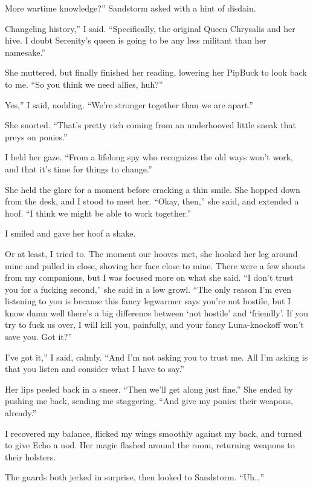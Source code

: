 \leavevmode{}More wartime knowledge?” Sandstorm asked with a hint of disdain.

\leavevmode{}Changeling history,” I said. “Specifically, the original Queen Chrysalis and her hive. I doubt Serenity’s queen is going to be any less militant than her namesake.”

She muttered, but finally finished her reading, lowering her PipBuck to look back to me. “So you think we need allies, huh?”

\leavevmode{}Yes,” I said, nodding. “We’re stronger together than we are apart.”

She snorted. “That’s pretty rich coming from an underhooved little sneak that preys on ponies.”

I held her gaze. “From a lifelong spy who recognizes the old ways won’t work, and that it’s time for things to change.”

She held the glare for a moment before cracking a thin smile. She hopped down from the desk, and I stood to meet her. “Okay, then,” she said, and extended a hoof. “I think we might be able to work together.”

I smiled and gave her hoof a shake.

Or at least, I tried to. The moment our hooves met, she hooked her leg around mine and pulled in close, shoving her face close to mine. There were a few shouts from my companions, but I was focused more on what she said. “I don’t trust you for a fucking second,” she said in a low growl. “The only reason I’m even listening to you is because this fancy legwarmer says you’re not hostile, but I know damn well there’s a big difference between ‘not hostile’ and ‘friendly’. If you try to fuck us over, I will kill you, painfully, and your fancy Luna-knockoff won’t save you. Got it?”

\leavevmode{}I’ve got it,” I said, calmly. “And I’m not asking you to trust me. All I’m asking is that you listen and consider what I have to say.”

Her lips peeled back in a sneer. “Then we’ll get along just fine.” She ended by pushing me back, sending me staggering. “And give my ponies their weapons, already.”

I recovered my balance, flicked my wings smoothly against my back, and turned to give Echo a nod. Her magic flashed around the room, returning weapons to their holsters.

The guards both jerked in surprise, then looked to Sandstorm. “Uh…”

